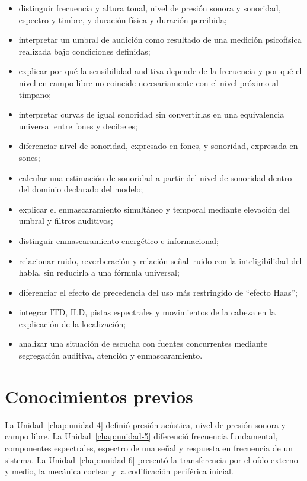 \begin{itemize}
    \item distinguir frecuencia y altura tonal, nivel de presión sonora y
    sonoridad, espectro y timbre, y duración física y duración percibida;
    \item interpretar un umbral de audición como resultado de una medición
    psicofísica realizada bajo condiciones definidas;
    \item explicar por qué la sensibilidad auditiva depende de la frecuencia y
    por qué el nivel en campo libre no coincide necesariamente con el nivel
    próximo al tímpano;
    \item interpretar curvas de igual sonoridad sin convertirlas en una
    equivalencia universal entre fones y decibeles;
    \item diferenciar nivel de sonoridad, expresado en fones, y sonoridad,
    expresada en sones;
    \item calcular una estimación de sonoridad a partir del nivel de sonoridad
    dentro del dominio declarado del modelo;
    \item explicar el enmascaramiento simultáneo y temporal mediante elevación
    del umbral y filtros auditivos;
    \item distinguir enmascaramiento energético e informacional;
    \item relacionar ruido, reverberación y relación señal--ruido con la
    inteligibilidad del habla, sin reducirla a una fórmula universal;
    \item diferenciar el efecto de precedencia del uso más restringido de
    ``efecto Haas'';
    \item integrar ITD, ILD, pistas espectrales y movimientos de la cabeza en
    la explicación de la localización;
    \item analizar una situación de escucha con fuentes concurrentes mediante
    segregación auditiva, atención y enmascaramiento.
\end{itemize}

\section{Conocimientos previos}
\label{sec:u7-conocimientos-previos}

La Unidad~\ref{chap:unidad-4} definió presión acústica, nivel de presión
sonora y campo libre. La Unidad~\ref{chap:unidad-5} diferenció frecuencia
fundamental, componentes espectrales, espectro de una señal y respuesta en
frecuencia de un sistema. La Unidad~\ref{chap:unidad-6} presentó la
transferencia por el oído externo y medio, la mecánica coclear y la
codificación periférica inicial.

